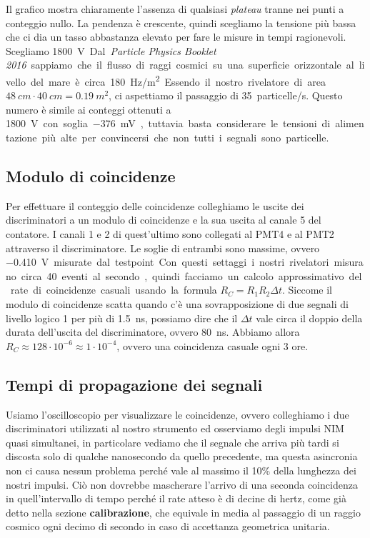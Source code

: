 \documentclass[a4paper]{article}
\begin{document}
Il grafico mostra chiaramente l'assenza di qualsiasi \emph{plateau} tranne nei punti a conteggio nullo.
La pendenza è crescente, quindi scegliamo la tensione più bassa che ci dia un tasso abbastanza elevato
per fare le misure in tempi ragionevoli.
Scegliamo \SI{1800}V.

Dal \emph{Particle Physics Booklet 2016} sappiamo che il flusso di raggi cosmici su una superficie orizzontale al livello del mare è circa \SI{180}{Hz/m^2}.
Essendo il nostro rivelatore di area $\SI{48}{cm}\cdot\SI{40}{cm}=\SI{0.19}{m^2}$,
ci aspettiamo il passaggio di \SI{35}{particelle/s}.
Questo numero è simile ai conteggi ottenuti a \SI{1800}V con soglia \SI{-376}{mV},
tuttavia basta considerare le tensioni di alimentazione più alte per convincersi
che non tutti i segnali sono particelle.

\subsection*{Modulo di coincidenze}

Per effettuare il conteggio delle coincidenze colleghiamo le uscite dei discriminatori a un modulo di coincidenze e la sua uscita al canale 5 del contatore.
I canali 1 e 2 di quest'ultimo sono collegati al PMT4 e al PMT2 attraverso il discriminatore.
Le soglie di entrambi sono massime, ovvero \SI{-0.410}V misurate dal testpoint.
Con questi settaggi i nostri rivelatori misurano circa 40 eventi al secondo,
quindi facciamo un calcolo approssimativo del rate di coincidenze casuali usando la formula
$R_C=R_1R_2\Delta t$.
Siccome il modulo di coincidenze scatta quando c'è una sovrapposizione di due segnali di livello logico 1 per più di \SI{1.5}{ns},
possiamo dire che il $\Delta t$ vale circa il doppio della durata dell'uscita del discriminatore, ovvero \SI{80}{ns}.
Abbiamo allora $R_C\approx 128\cdot10^{-6}\approx1\cdot10^{-4}$,
ovvero una coincidenza casuale ogni 3 ore.

\subsection*{Tempi di propagazione dei segnali}

Usiamo l'oscilloscopio per visualizzare le coincidenze, ovvero colleghiamo i due discriminatori utilizzati al nostro strumento ed osserviamo degli impulsi NIM quasi simultanei, in particolare vediamo che il segnale che arriva più tardi si discosta solo di qualche nanosecondo da quello precedente, ma questa asincronia non ci causa nessun problema perché vale al massimo il 10\% della lunghezza dei nostri impulsi.
Ciò non dovrebbe mascherare l'arrivo di una seconda coincidenza in quell'intervallo di tempo perché il rate atteso è di decine di hertz, come già detto nella sezione \textbf{calibrazione}, che equivale in media al passaggio di un raggio cosmico ogni decimo di secondo in caso di accettanza geometrica unitaria.
\end{document}
